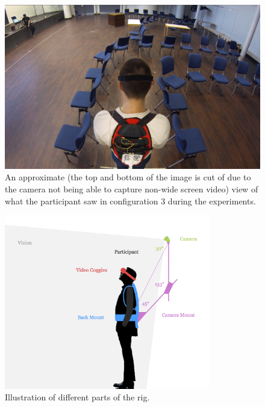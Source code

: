 \documentclass[runningheads,a4paper,oribibl]{llncs}
\begin{document}
\begin{figure}
   \centering
   \includegraphics[width=\textwidth]{ExternalMaterial/3Pview}

   \caption{An approximate (the top and bottom of the image is cut of due to the camera not being able to capture non-wide screen video) view of what the participant saw in configuration 3 during the experiments. \label{fig:3Pview}}
\end{figure}



\begin{figure}
   \centering
   \includegraphics[width=0.8\textwidth]{ExternalMaterial/Rig}
   \caption{Illustration of different parts of the rig. \label{fig:RigDesign}}
\end{figure}
\end{document}
